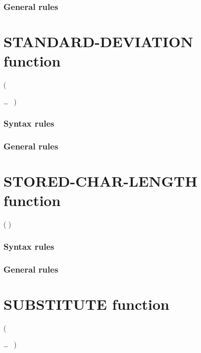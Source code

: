 \subsubsection{General rules}

\section{STANDARD-DEVIATION function}

\begin{syntax}
    (
  \begin{1=}
    \argument
  \end{1=}\ldots
  \ {})
\end{syntax}

\subsubsection{Syntax rules}

\subsubsection{General rules}

\section{STORED-CHAR-LENGTH function}

\begin{syntax}[\gnucobolcolour]
    ( \argument )
\end{syntax}

\subsubsection{Syntax rules}

\subsubsection{General rules}

\section{SUBSTITUTE function}

\begin{syntax}[\gnucobolcolour]
    ( \argument
  \begin{1=}
    \argument \argument
  \end{1=}\ldots\ {}
  )
\end{syntax}


